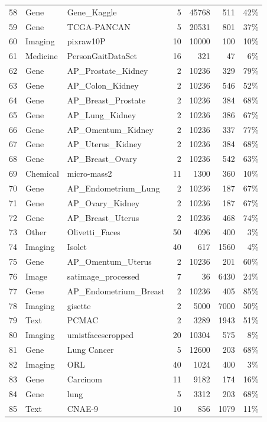 \documentclass[preprint,12pt,authoryear]{elsarticle}
\begin{document}
{{{\begin{longtable}{@{}r p{1.9cm} p{6.7cm} r r r r@{}}
58 & Gene & Gene\_Kaggle & 5 & 45768 & 511 & 42\% \\
59 & Gene & TCGA-PANCAN & 5 & 20531 & 801 & 37\% \\
60 & Imaging & pixraw10P & 10 & 10000 & 100 & 10\% \\
61 & Medicine & PersonGaitDataSet & 16 & 321 & 47 & 6\% \\
62 & Gene & AP\_Prostate\_Kidney & 2 & 10236 & 329 & 79\% \\
63 & Gene & AP\_Colon\_Kidney & 2 & 10236 & 546 & 52\% \\
64 & Gene & AP\_Breast\_Prostate & 2 & 10236 & 384 & 68\% \\
65 & Gene & AP\_Lung\_Kidney & 2 & 10236 & 386 & 67\% \\
66 & Gene & AP\_Omentum\_Kidney & 2 & 10236 & 337 & 77\% \\
67 & Gene & AP\_Uterus\_Kidney & 2 & 10236 & 384 & 68\% \\
68 & Gene & AP\_Breast\_Ovary & 2 & 10236 & 542 & 63\% \\
69 & Chemical & micro-mass2 & 11 & 1300 & 360 & 10\% \\
70 & Gene & AP\_Endometrium\_Lung & 2 & 10236 & 187 & 67\% \\
71 & Gene & AP\_Ovary\_Kidney & 2 & 10236 & 187 & 67\% \\
72 & Gene & AP\_Breast\_Uterus & 2 & 10236 & 468 & 74\% \\
73 & Other & Olivetti\_Faces & 50 & 4096 & 400 & 3\% \\
74 & Imaging & Isolet & 40 & 617 & 1560 & 4\% \\
75 & Gene & AP\_Omentum\_Uterus & 2 & 10236 & 201 & 60\% \\
76 & Image & satimage\_processed & 7 & 36 & 6430 & 24\% \\
77 & Gene & AP\_Endometrium\_Breast & 2 & 10236 & 405 & 85\% \\
78 & Imaging & gisette & 2 & 5000 & 7000 & 50\% \\
79 & Text & PCMAC & 2 & 3289 & 1943 & 51\% \\
80 & Imaging & umistfacescropped & 20 & 10304 & 575 & 8\% \\
81 & Gene & Lung Cancer & 5 & 12600 & 203 & 68\% \\
82 & Imaging & ORL & 40 & 1024 & 400 & 3\% \\
83 & Gene & Carcinom & 11 & 9182 & 174 & 16\% \\
84 & Gene & lung & 5 & 3312 & 203 & 68\% \\
85 & Text & CNAE-9 & 10 & 856 & 1079 & 11\% \\

\end{longtable}}}}
\end{document}
